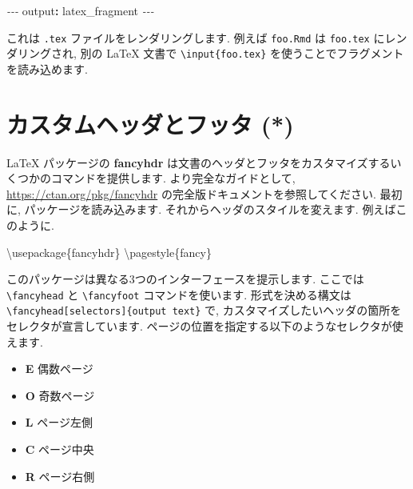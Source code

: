 \documentclass[
  11pt,
  lualatex,ja=standard,jafont=noto]{bxjsreport}
\newenvironment{Shaded}{\begin{snugshade}}{\end{snugshade}}
\newcommand{\AttributeTok}[1]{\textcolor[rgb]{0.77,0.63,0.00}{#1}}
\newcommand{\BuiltInTok}[1]{#1}
\newcommand{\ExtensionTok}[1]{#1}
\newcommand{\FunctionTok}[1]{\textcolor[rgb]{0.00,0.00,0.00}{#1}}
\newcommand{\KeywordTok}[1]{\textcolor[rgb]{0.13,0.29,0.53}{\textbf{#1}}}
\newcommand{\NormalTok}[1]{#1}
\newcommand{\PreprocessorTok}[1]{\textcolor[rgb]{0.56,0.35,0.01}{\textit{#1}}}
\providecommand{\tightlist}{%
  \setlength{\itemsep}{0pt}\setlength{\parskip}{0pt}}
\begin{document}
\begin{Shaded}
\begin{Highlighting}[]
\PreprocessorTok{{-}{-}{-}}
\FunctionTok{output}\KeywordTok{:}\AttributeTok{ latex\_fragment}
\PreprocessorTok{{-}{-}{-}}
\end{Highlighting}
\end{Shaded}

これは \texttt{.tex} ファイルをレンダリングします. 例えば \texttt{foo.Rmd} は \texttt{foo.tex} にレンダリングされ, 別の LaTeX 文書で \texttt{\textbackslash{}input\{foo.tex\}} を使うことでフラグメントを読み込めます.

\hypertarget{latex-header}{%
\section{カスタムヘッダとフッタ (*)}\label{latex-header}}

LaTeX パッケージの \textbf{fancyhdr} は文書のヘッダとフッタをカスタマイズするいくつかのコマンドを提供します. より完全なガイドとして, \url{https://ctan.org/pkg/fancyhdr} の完全版ドキュメントを参照してください. 最初に, パッケージを読み込みます. それからヘッダのスタイルを変えます. 例えばこのように.

\begin{Shaded}
\begin{Highlighting}[]
\BuiltInTok{\textbackslash{}usepackage}\NormalTok{\{}\ExtensionTok{fancyhdr}\NormalTok{\}}
\FunctionTok{\textbackslash{}pagestyle}\NormalTok{\{fancy\}}
\end{Highlighting}
\end{Shaded}

このパッケージは異なる3つのインターフェースを提示します. ここでは \texttt{\textbackslash{}fancyhead} と \texttt{\textbackslash{}fancyfoot} コマンドを使います. 形式を決める構文は \texttt{\textbackslash{}fancyhead{[}selectors{]}\{output\ text\}} で, カスタマイズしたいヘッダの箇所をセレクタが宣言しています. ページの位置を指定する以下のようなセレクタが使えます.

\begin{itemize}
\tightlist
\item
  \textbf{E} 偶数ページ
\item
  \textbf{O} 奇数ページ
\item
  \textbf{L} ページ左側
\item
  \textbf{C} ページ中央
\item
  \textbf{R} ページ右側
\end{itemize}
\end{document}
